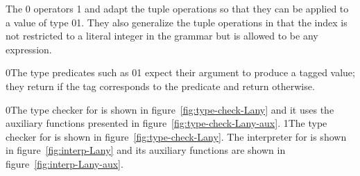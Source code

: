 \documentclass[7x10]{TimesAPriori_MIT}%
\def\racketEd{0}
\def\pythonEd{1}
\providecommand{\BookEdition}{1}
\let\edition\BookEdition
\newcommand{\racket}[1]{{\if\edition\racketEd{#1}\fi}}
\newcommand{\pythonColor}[0]{}
\newcommand{\python}[1]{{\if\edition\pythonEd\pythonColor #1\fi}}
\numberwithin{theorem}{chapter}
\numberwithin{definition}{chapter}
\numberwithin{equation}{chapter}
\begin{document}
The \racket{} operators
\python{ and } adapt the tuple
operations so that they can be applied to a value of type
\racket{}\python{}.  They also generalize the
tuple operations in that the index is not restricted to a literal
integer in the grammar but is allowed to be any expression.

\racket{The type predicates such as
\racket{}\python{\key{is\_bool}} expect their argument
to produce a tagged value; they return  {\TRUE} if the tag corresponds to
the predicate and return {\FALSE} otherwise.}

\racket{The type checker for \LangAny{} is shown in figure~\ref{fig:type-check-Lany}
and it uses the auxiliary functions presented in figure~\ref{fig:type-check-Lany-aux}.}
\python{The type checker for \LangAny{} is shown in figure~\ref{fig:type-check-Lany}.}
The interpreter for \LangAny{} is shown in figure~\ref{fig:interp-Lany} and
its auxiliary functions are shown in figure~\ref{fig:interp-Lany-aux}.
\end{document}
